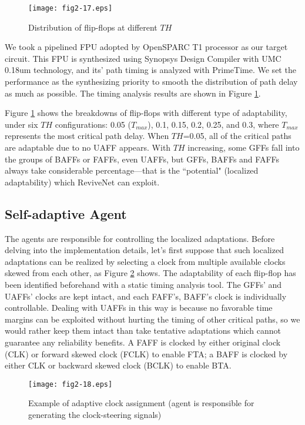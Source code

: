 \begin{figure}[t]
\centering
\texttt{[image: fig2-17.eps]}
    \caption{Distribution of flip-flops at different $TH$}\label{ff_type}
\end{figure}

We took a pipelined FPU adopted by OpenSPARC T1 \cite{OpenSPARC_06} processor as our target circuit. This FPU is synthesized using Synopsys Design Compiler with UMC 0.18um technology, and its' path timing is analyzed with PrimeTime. We set the performance as the synthesizing priority to smooth the distribution of path delay as much as possible. The timing analysis results are shown in Figure \ref{ff_type}.

Figure \ref{ff_type} shows the breakdowns of flip-flops with different type of adaptability, under six $TH$ configurations: 0.05 ($T_{max}$), 0.1, 0.15, 0.2, 0.25, and 0.3, where $T_{max}$ represents the most critical path delay. When $TH$=0.05, all of the critical paths are adaptable due to no  UAFF appears. With $TH$ increasing, some GFFs fall into the groups of BAFFs or FAFFs, even UAFFs, but GFFs, BAFFs and FAFFs always take considerable percentage---that is the ``potential" (localized adaptability) which ReviveNet can exploit.

\subsection{Self-adaptive Agent} \label{agentdesign}
The agents are responsible for controlling the localized adaptations. Before delving into the implementation details, let's first suppose that such localized adaptations can be realized by selecting a clock from multiple available clocks skewed from each other, as Figure \ref{affs} shows. The adaptability of each flip-flop has been identified beforehand with a static timing analysis tool. The GFFs' and UAFFs' clocks are kept intact, and each FAFF's, BAFF's clock is individually controllable. Dealing with UAFFs in this way is because no favorable time margins can be exploited without hurting the timing of other critical paths, so we would rather keep them intact than take tentative adaptations which cannot guarantee any reliability benefits. A FAFF is clocked by either original clock (CLK) or forward skewed clock (FCLK) to enable FTA; a BAFF is clocked by either CLK or backward skewed clock (BCLK) to enable BTA.

\begin{figure}[t]
\centering
\texttt{[image: fig2-18.eps]}
   \caption{Example of adaptive clock assignment (agent is responsible for
   generating the clock-steering signals)}\label{affs}
\end{figure}

